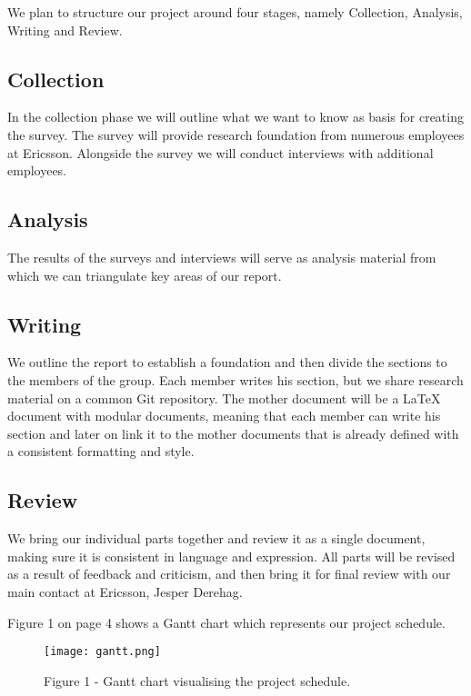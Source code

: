 \documentclass[ProjectPlan_innit.tex]{subfiles}
\begin{document}
We plan to structure our project around four stages, namely Collection, Analysis, Writing and Review. 

\subsection{Collection}
In the collection phase we will outline what we want to know as basis for creating the survey. The survey will provide research foundation from numerous employees at Ericsson. Alongside the survey we will conduct interviews with additional employees. 

\subsection{Analysis}
The results of the surveys and interviews will serve as analysis material from which we can triangulate key areas of our report.

\subsection{Writing}
We outline the report to establish a foundation and then divide the sections to the members of the group. Each member writes his section, but we share research material on a common Git repository. The mother document will be a LaTeX document with modular documents, meaning that each member can write his section and later on link it to the mother documents that is already defined with a consistent formatting and style.

\subsection{Review}
We bring our individual parts together and review it as a single document, making sure it is consistent in language and expression. All parts will be revised as a result of feedback and criticism, and then bring it for final review with our main contact at Ericsson, Jesper Derehag.  

\smallskip

Figure 1 on page 4 shows a Gantt chart which represents our project schedule. 

\begin{figure*}[H!]
	\texttt{[image: gantt.png]}
	\caption{Figure 1 - Gantt chart visualising the project schedule.}
	\label{AAA}
\end{figure*}
\end{document}
